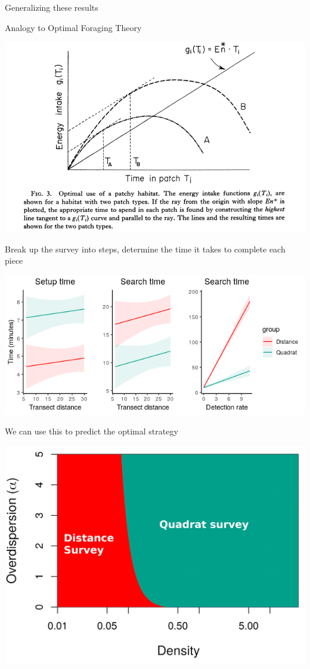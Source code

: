 \documentclass[ignorenonframetext,]{beamer}
\begin{document}
\begin{frame}{Generalizing these results}
\protect\hypertarget{generalizing-these-results}{}

\begin{block}{Analogy to Optimal Foraging Theory}

\begin{center}\includegraphics[width=0.8\linewidth]{../Figures/OptForTheory} \end{center}

\end{block}

\begin{block}{Break up the survey into steps, determine the time it
takes to complete each piece}

\begin{center}\includegraphics[width=0.8\linewidth]{../Figures/TimeBudgetEstimates} \end{center}

\end{block}

\begin{block}{We can use this to predict the optimal strategy}

\begin{center}\includegraphics[width=0.65\linewidth]{../Figures/OptStrategy2} \end{center}


\end{block}
\end{frame}
\end{document}
